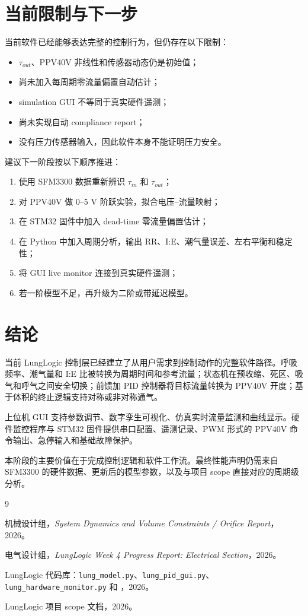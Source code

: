 \documentclass[UTF8,11pt,a4paper]{ctexart}
\begin{document}
\section{当前限制与下一步}

当前软件已经能够表达完整的控制行为，但仍存在以下限制：
\begin{itemize}
  \item $\tau_{out}$、PPV40V 非线性和传感器动态仍是初始值；
  \item 尚未加入每周期零流量偏置自动估计；
  \item simulation GUI 不等同于真实硬件遥测；
  \item 尚未实现自动 compliance report；
  \item 没有压力传感器输入，因此软件本身不能证明压力安全。
\end{itemize}

建议下一阶段按以下顺序推进：
\begin{enumerate}
  \item 使用 SFM3300 数据重新辨识 $\tau_{in}$ 和 $\tau_{out}$；
  \item 对 PPV40V 做 0--5 V 阶跃实验，拟合电压--流量映射；
  \item 在 STM32 固件中加入 dead-time 零流量偏置估计；
  \item 在 Python 中加入周期分析，输出 RR、I:E、潮气量误差、左右平衡和稳定性；
  \item 将 GUI live monitor 连接到真实硬件遥测；
  \item 若一阶模型不足，再升级为二阶或带延迟模型。
\end{enumerate}

\section{结论}

当前 LungLogic 控制层已经建立了从用户需求到控制动作的完整软件路径。呼吸频率、潮气量和 I:E 比被转换为周期时间和参考流量；状态机在预收缩、死区、吸气和呼气之间安全切换；前馈加 PID 控制器将目标流量转换为 PPV40V 开度；基于体积的终止逻辑支持对称或非对称通气。

上位机 GUI 支持参数调节、数字孪生可视化、仿真实时流量监测和曲线显示。硬件监控程序与 STM32 固件提供串口配置、遥测记录、PWM 形式的 PPV40V 命令输出、急停输入和基础故障保护。

本阶段的主要价值在于完成控制逻辑和软件工作流。最终性能声明仍需来自 SFM3300 的硬件数据、更新后的模型参数，以及与项目 scope 直接对应的周期级分析。

\begin{thebibliography}{9}

机械设计组，\textit{System Dynamics and Volume Constraints / Orifice Report}，2026。

电气设计组，\textit{LungLogic Week 4 Progress Report: Electrical Section}，2026。

LungLogic 代码库：\texttt{lung\_model.py}、\texttt{lung\_pid\_gui.py}、\texttt{lung\_hardware\_monitor.py} 和 ，2026。

LungLogic 项目 scope 文档，2026。

\end{thebibliography}
\end{document}
